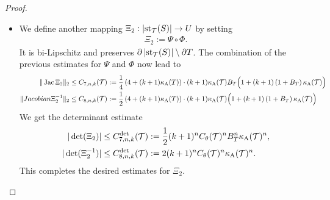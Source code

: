 \documentclass[10pt,letterpaper]{article}
\begin{document}
\begin{proof}
\begin{itemize}
        
        
        
        





        
        
        
        
        
        
        \item 
        We define another mapping $ \Xi_{2} : \left| \operatorname{st}_{{\mathcal T}}(S) \right| \rightarrow U $ by setting 
        \begin{align*}
            \Xi_{2} := \Psi \circ \Phi.
        \end{align*}
        It is bi-Lipschitz and preserves $\partial\left| \operatorname{st}_{{\mathcal T}}(S) \right| \setminus \partial T$. 
        The combination of the previous estimates for $\Psi$ and $\Phi$ now lead to 
        \begin{align*}
            \|  \operatorname{{\rm Jac}} \Xi_{2}  \|_{2}
            &\leq 
            C_{7,n,k}({\mathcal T})
            :=
            \frac 1 4
            \left( 4 + (k+1) \kappa_{\rm A}(T) \right)
            \cdot 
            (k+1) 
            \kappa_{\rm A}({\mathcal T})
            B_{T}
            \Big( 
                1 
                + 
                (k+1) 
                \left( 1 + B_{T} \right)
                \kappa_{\rm A}({\mathcal T})
            \Big)            
            \\
            \|  Jacobian \Xi_{2}^{-1}  \|_{2}
            &\leq  
            C_{8,n,k}({\mathcal T})
            :=
            \frac 1 2
            \left( 4 + (k+1) \kappa_{\rm A}(T) \right)
            \cdot 
            (k+1) 
            \kappa_{\rm A}({\mathcal T})
            \Big( 
                1 
                + 
                (k+1) 
                \left( 1 + B_{T} \right)
                \kappa_{\rm A}({\mathcal T})
            \Big)            
        \end{align*}
        We get the determinant estimate 
        \begin{align*}
            |\det(\Xi_{2})|
            &\leq 
            C^{\det}_{7,n,k}({\mathcal T})
            :=
            \frac 1 2 
            (k+1)^{n}
            C_\theta({\mathcal T})^{n}
            B_{T}^{n}
            \kappa_{\rm A}({\mathcal T})^{n}
            ,
            \\
            |\det(\Xi_{2}^{-1})|
            &\leq 
            C^{\det}_{8,n,k}({\mathcal T})
            :=
            2
            (k+1)^{n}
            C_\theta({\mathcal T})^{n}
            \kappa_{\rm A}({\mathcal T})^{n}
            .
        \end{align*}
        This completes the desired estimates for $\Xi_{2}$. 
        

\end{itemize}
\end{proof}
\end{document}
